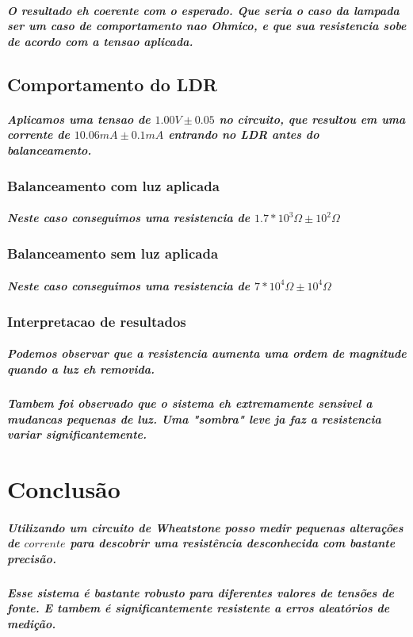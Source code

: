\documentclass[12pt,twoside, a4paper, twocolumn]{article}
\begin{document}
\subparagraph*{O resultado eh coerente com o esperado. Que seria o caso da lampada ser um caso de comportamento nao Ohmico, e que sua resistencia sobe de acordo com a tensao aplicada.}


\subsection{Comportamento do LDR}

\subparagraph*{Aplicamos uma tensao de $1.00V \pm 0.05$ no circuito, que resultou em uma corrente de $10.06mA \pm 0.1mA$ entrando no LDR antes do balanceamento.}

\subsubsection{Balanceamento com luz aplicada}

\subparagraph*{Neste caso conseguimos uma resistencia de $1.7*10^{3} \varOmega \pm 10^2 \varOmega$}

\subsubsection{Balanceamento sem luz aplicada}

\subparagraph*{Neste caso conseguimos uma resistencia de $7*10^{4} \varOmega \pm 10^4 \varOmega$}

\subsubsection{Interpretacao de resultados}

\subparagraph*{Podemos observar que a resistencia aumenta uma ordem de magnitude quando a luz eh removida. }

\subparagraph{Tambem foi observado que o sistema eh extremamente sensivel a mudancas pequenas de luz. Uma "sombra" leve ja faz a resistencia variar significantemente.}

\section{Conclusão}

\subparagraph*{Utilizando um circuito de \emph{Wheatstone} posso medir pequenas alterações de $corrente$ para descobrir uma resistência desconhecida com bastante precisão.}

\subparagraph*{Esse sistema é bastante robusto para diferentes valores de tensões de fonte. E tambem é significantemente resistente a erros aleatórios de medição.}
\end{document}
